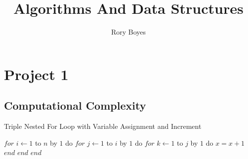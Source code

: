 \documentclass[a4paper]{article}
\title{Algorithms And Data Structures}
\author{Rory Boyes}
\begin{document}
\maketitle









\titlepage
\tableofcontents
\newpage



\section{Project 1}
\subsection{Computational Complexity}

\begin{algorithm}
\caption{Triple Nested For Loop with Variable Assignment and Increment}\label{euclid}
\begin{algorithmic}[1]
\State$for$ $i \leftarrow 1$ to $n$ by $1$ do 
\State\quad $for$ $j \leftarrow 1$ to $i$ by $1$ do 
\State\quad \quad $for$ $k \leftarrow 1$ to $j$ by $1$ do 
\State\quad \quad \quad $x = x +1$
\State\quad \quad $end$
\State\quad $end$
\State$end$ 
\EndProcedure
\end{algorithmic}
\end{algorithm}
\end{document}

